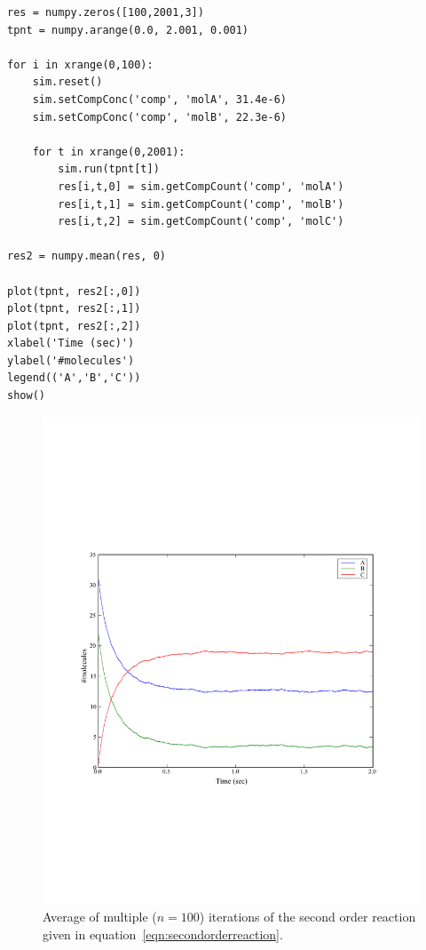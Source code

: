 \documentclass[a4paper,12pt]{book}
\begin{document}
\begin{verbatim}
res = numpy.zeros([100,2001,3])
tpnt = numpy.arange(0.0, 2.001, 0.001)

for i in xrange(0,100):
    sim.reset()
    sim.setCompConc('comp', 'molA', 31.4e-6)
    sim.setCompConc('comp', 'molB', 22.3e-6)
    
    for t in xrange(0,2001):
        sim.run(tpnt[t])
        res[i,t,0] = sim.getCompCount('comp', 'molA')
        res[i,t,1] = sim.getCompCount('comp', 'molB')
        res[i,t,2] = sim.getCompCount('comp', 'molC')

res2 = numpy.mean(res, 0)

plot(tpnt, res2[:,0])
plot(tpnt, res2[:,1])
plot(tpnt, res2[:,2])
xlabel('Time (sec)')
ylabel('#molecules')
legend(('A','B','C'))
show()
\end{verbatim}

\begin{figure}
\centering
\includegraphics[width=13cm]{secondorderreaction02.pdf}
\caption{Average of multiple ($n=100$) iterations of the second order reaction given in equation~\ref{eqn:secondorderreaction}.}
\label{fig:secondorderreaction02}
\end{figure}
\end{document}
